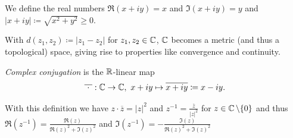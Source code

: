\documentclass[a4paper,english]{article}
\begin{document}
\begin{marginfigure}
    \centering
    \caption[Complex addition and conjugation.]{Two complex numbers in the complex plane and their sum ("Parallelogram rule").
    Complex conjugation represents a reflection upon the real line.}
\end{marginfigure}

\begin{defn}[$\Re(x + i y)$, $\Im(x + i y)$, $| x + i y |$]
    We define the real numbers $\Re(x + i y) = x$ and $\Im(x + i y) = y$ and $| x + i y | \coloneqq \sqrt{x^2 + y^2} \ge 0$.
\end{defn}

With $d(z_1, z_2) \coloneqq | z_1 - z_2 |$ for $z_1, z_2 \in \operatorname{\mathbb{C}}$, $\operatorname{\mathbb{C}}$ becomes a metric (and thus a topological) space, giving rise to properties like convergence and continuity.

\begin{defn}
    \emph{Complex conjugation} is the $\operatorname{\mathbb{R}}$-linear map
    \begin{equation*}
        \overline{\ \cdot \ }: \CC \to \CC, \ 
        x + i y \mapsto \overline{x + i y} \coloneqq x - i y.
    \end{equation*}
\end{defn}


With this definition we have $z \cdot \overline{z} = | z |^2$ and $z^{-1} = \frac{\overline{z}}{| z |^2}$ for $z \in \operatorname{\mathbb{C}} \setminus \{0\}$ and thus $\Re(z^{-1}) = \frac{\Re(z)}{\Re(z)^2 + \Im(z)^2}$ and $\Im(z^{-1}) = - \frac{\Im(z)}{\Re(z)^2 + \Im(z)^2}$
\end{document}
